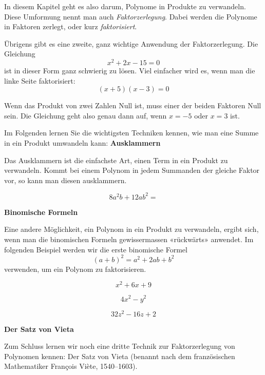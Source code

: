 In diesem Kapitel geht es also darum, Polynome in Produkte zu verwandeln. Diese Umformung nennt man auch \emph{Faktorzerlegung}. Dabei werden die Polynome in Faktoren zerlegt, oder kurz \emph{faktorisiert}.

Übrigens gibt es eine zweite, ganz wichtige Anwendung der Faktorzerlegung. Die Gleichung
\[
    x^2+2x-15=0
\]
ist in dieser Form ganz schwierig zu lösen. Viel einfacher wird es, wenn man die linke Seite faktorisiert:
\[
    (x+5)(x-3)=0
\]

Wenn das Produkt von zwei Zahlen Null ist, muss einer der beiden Faktoren Null sein. Die Gleichung geht also genau dann auf, wenn \(x=-5\) oder \(x=3\) ist.

\bigskip

Im Folgenden lernen Sie die wichtigsten Techniken kennen, wie man eine Summe in ein Produkt umwandeln kann:
\textbf{Ausklammern}

Das Ausklammern ist die einfachste Art, einen Term in ein Produkt zu verwandeln.
Kommt bei einem Polynom in jedem Summanden der gleiche Faktor vor, so kann man
diesen ausklammern.

\begin{bsp}{}{}
    \[
        8a^2b + 12ab^2 =
    \]
    \vspace*{1cm}
\end{bsp}
\clearpage
\textbf{Binomische Formeln}

Eine andere Möglichkeit, ein Polynom in ein Produkt zu verwandeln, ergibt sich,
wenn man die binomischen Formeln gewissermassen «rückwärts» anwendet. Im
folgenden Beispiel werden wir die erste binomische Formel
\[
    (a+b)^2 = a^2 + 2ab + b^2
\]
verwenden, um ein Polynom zu faktorisieren.

\begin{bsp}{}{}
    \[
        x^2 + 6x + 9
    \]
    \vspace*{1cm}
\end{bsp}

\begin{bsp}{}{}
    \[
        4x^2-y^2
    \]
    \vspace*{1cm}
\end{bsp}

\begin{bsp}{}{}
    \[
        32z^2-16z+2
    \]
    \vspace*{1cm}
\end{bsp}

\textbf{Der Satz von Vieta}

Zum Schluss lernen wir noch eine dritte Technik zur Faktorzerlegung von Polynomen
kennen: Der Satz von Vieta (benannt nach dem französischen Mathematiker
François Viète, 1540--1603).

